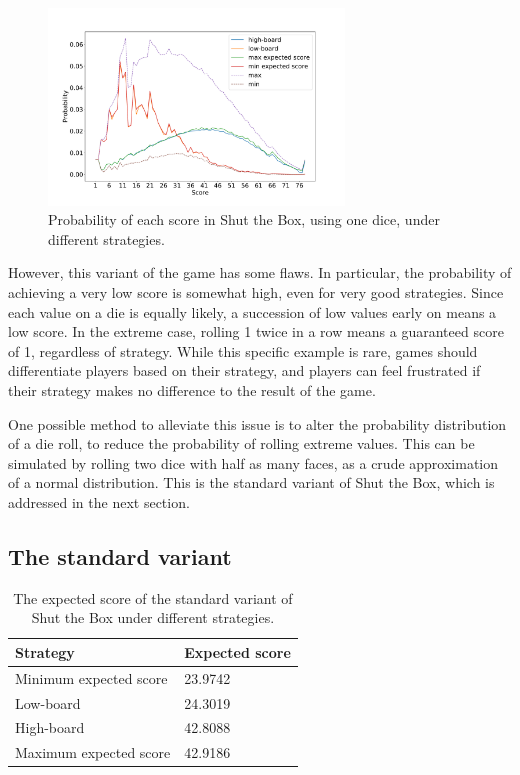 \begin{figure}[h]
    \centering
    \vspace*{-0.4cm}    \includegraphics[width=0.7\textwidth]{images/ShutTheBox/stb12_1d12_prob_score.pdf}
    \vspace*{-0.4cm}
    \caption{Probability of each score in Shut the Box, using one dice, under different strategies.}
\label{cs1:stb12_1d12_prob_score}
    \vspace*{-0.2cm}
\end{figure}

However, this variant of the game has some flaws. In particular, the probability of achieving a very low score is somewhat high, even for very good strategies. Since each value on a die is equally likely, a succession of low values early on means a low score. In the extreme case, rolling 1 twice in a row means a guaranteed score of 1, regardless of strategy. While this specific example is rare, games should differentiate players based on their strategy, and players can feel frustrated if their strategy makes no difference to the result of the game.

One possible method to alleviate this issue is to alter the probability distribution of a die roll, to reduce the probability of rolling extreme values. This can be simulated by rolling two dice with half as many faces, as a crude approximation of a normal distribution. This is the standard variant of Shut the Box, which is addressed in the next section.

\subsection{The standard variant}
\label{cs1:stb_standard}

\begin{table}[h]
    \centering
    \begin{tabular}{@{}ll@{}}
    \toprule
    Strategy                   & Expected score     \\ \midrule
    \multicolumn{1}{l|}{Minimum expected score}    & 23.9742  \\
    \multicolumn{1}{l|}{Low-board}  & 24.3019 \\
    \multicolumn{1}{l|}{High-board} & 42.8088 \\
    \multicolumn{1}{l|}{Maximum expected score}    & 42.9186
    \end{tabular}
    \caption{The expected score of the standard variant of Shut the Box under different strategies.}
    \label{cs1:exp_value_results}
\end{table}

